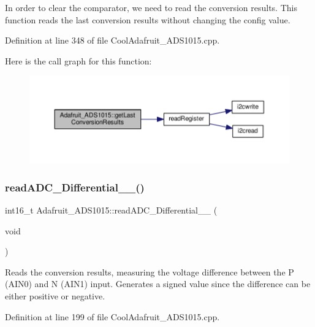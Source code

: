 In order to clear the comparator, we need to read the conversion results. This function reads the last conversion results without changing the config value. 



Definition at line 348 of file Cool\+Adafruit\+\_\+\+A\+D\+S1015.\+cpp.

Here is the call graph for this function\+:
\nopagebreak
\begin{figure}[H]
\begin{center}
\leavevmode
\includegraphics[width=350pt]{class_adafruit___a_d_s1015_ad8f36d80847020778425107f6451a8c2_cgraph}
\end{center}
\end{figure}
\mbox{\label{class_adafruit___a_d_s1015_a56582333958e66efaccd3d4a8a47e3ff}} 
\subsubsection{\texorpdfstring{read\+A\+D\+C\+\_\+\+Differential\+\_\+\_()}{readADC\_Differential\_0\_1()}}
{\footnotesize\ttfamily int16\+\_\+t Adafruit\+\_\+\+A\+D\+S1015\+::read\+A\+D\+C\+\_\+\+Differential\+\_\+\_ (\begin{DoxyParamCaption}\item[{void}]{ }\end{DoxyParamCaption})}



Reads the conversion results, measuring the voltage difference between the P (A\+I\+N0) and N (A\+I\+N1) input. Generates a signed value since the difference can be either positive or negative. 



Definition at line 199 of file Cool\+Adafruit\+\_\+\+A\+D\+S1015.\+cpp.

